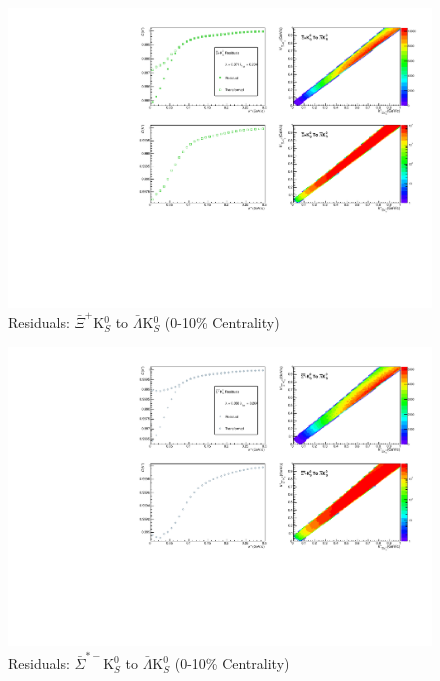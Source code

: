 \documentclass[../AnalysisNoteJBuxton.tex]{subfiles}
\begin{document}
\begin{figure}[h]
  \centering
  \includegraphics[width=\textwidth]{9_AdditionalFigures/Figures/Residuals/ALamK0/Residuals_ALamK0_0010_AXiK0_MomResCrctn_NonFlatBgdCrctn_SingleLamParam_ResidualsIncluded_UsingCoulombOnlyInterpCfs.pdf}
  \caption[Residuals: $\bar{\Xi}^{+}$K$^{0}_{S}$ to $\bar{\Lambda}$K$^{0}_{S}$ (0-10\% Centrality)]{Residuals: $\bar{\Xi}^{+}$K$^{0}_{S}$ to $\bar{\Lambda}$K$^{0}_{S}$ (0-10\% Centrality)}
  \label{fig:Res_ALamK0_0010_AXiCK0}
\end{figure}


\begin{figure}[h]
  \centering
  \includegraphics[width=\textwidth]{9_AdditionalFigures/Figures/Residuals/ALamK0/Residuals_ALamK0_0010_ASigStMK0_MomResCrctn_NonFlatBgdCrctn_SingleLamParam_ResidualsIncluded_UsingCoulombOnlyInterpCfs.pdf}
  \caption[Residuals: $\bar{\Sigma}^{*-}$K$^{0}_{S}$ to $\bar{\Lambda}$K$^{0}_{S}$ (0-10\% Centrality)]{Residuals: $\bar{\Sigma}^{*-}$K$^{0}_{S}$ to $\bar{\Lambda}$K$^{0}_{S}$ (0-10\% Centrality)}
  \label{fig:Res_ALamK0_0010_ASigStMK0}
\end{figure}
\end{document}
